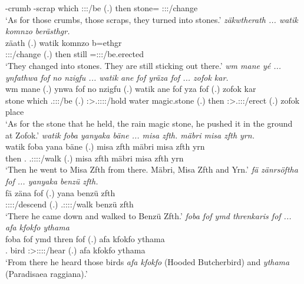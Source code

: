 \begin{exe}
	\Redup-crumb{} \Redup-scrap which \Sg:\Sbj:\Pst:\Ipfv/be (.) then stone=\Purp{} \Dem{} \Emph{} \Stpl:\Sbj:\Pst:\Ipfv/change \Emph{}\\
	\trans `As for those crumbs, those scraps, they turned into stones.'
	\emph{zäkwtherath ... watik komnzo berästhgr.}\\
	\gll zäath (.) watik komnzo b=ethgr\\ 
	\Stpl:\Sbj:\Pst:\Pfv/change (.) then still \Med=\Stpl:\Sbj:\Nonpast:\Stat/be.erected\\
	\trans `They changed into stones. They are still sticking out there.'
	\emph{wm mane yé ... ynfathwa fof no nzigfu ... watik ane fof yräza fof ... zofok kar.}\\
	\gll wm mane  (.) ynwa fof no nzigfu (.) watik ane fof yza fof (.) zofok kar\\ 
	stone which \Tsg.\Masc:\Sbj:\Nonpast:\Ipfv/be (.) \Sg:\Sbj>\Tsg.\Masc:\Obj:\Pst:\Ipfv:\Venit/hold \Emph{} water magic.stone (.) then \Dem{} \Emph{} \Sg:\Sbj>\Tsg.\Masc:\Obj:\Nonpast:\Ipfv/erect \Emph{} (.) zofok place\\
	\trans `As for the stone that he held, the rain magic stone, he pushed it in the ground at Zofok.'
	\emph{watik foba yanyaka bäne ... misa zfth. mäbri misa zfth yrn.}\\
	\gll watik foba yana bäne (.) {misa zfth} mäbri {misa zfth} yrn\\ 
	then \Dist.\Abl{} \Tsg.\Masc:\Sbj:\Pst:\Ipfv:\Venit/walk \Recog{} (.) {misa zfth} mäbri {misa zfth} yrn\\
	\trans `Then he went to Misa Zfth from there. Mäbri, Misa Zfth and Yrn.'
	\emph{fä zänrsöftha fof ... yanyaka benzü zfth.}\\
	\gll fä zäna fof (.) yana {benzü zfth}\\ 
	\Dist{} \Sg:\Sbj:\Pst:\Pfv:\Venit/descend \Emph{} (.) \Tsg.\Masc:\Sbj:\Pst:\Ipfv:\Venit/walk {benzü zfth}\\
	\trans `There he came down and walked to Benzü Zfth.'
	\emph{foba fof ymd threnkaris fof ... afa kfokfo ythama}\\
	\gll foba fof ymd thren fof (.) {afa kfokfo} ythama\\ 
	\Dist.\Abl{} \Emph{} bird \Stsg:\Sbj>\Stpl:\Obj:\Irr:\Pfv:\Venit/hear \Emph{} (.) {afa kfokfo} ythama\\
	\trans `From there he heard those birds \emph{afa kfokfo} (Hooded Butcherbird) and \emph{ythama} (Paradisaea raggiana).'

\end{exe}
